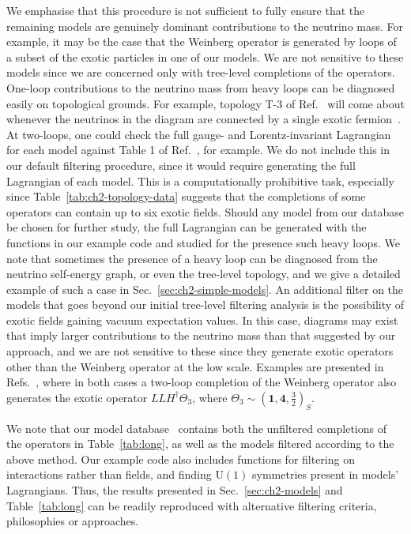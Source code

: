 We emphasise that this procedure is not sufficient to fully ensure that the
remaining models are genuinely dominant contributions to the neutrino mass. For
example, it may be the case that the Weinberg operator is generated by loops of
a subset of the exotic particles in one of our models. We are not sensitive to
these models since we are concerned only with tree-level completions of the
operators. One-loop contributions to the neutrino mass from heavy loops can be
diagnosed easily on topological grounds. For example, topology \textsf{T-3} of
Ref.~\cite{Bonnet:2009ej} will come about whenever the neutrinos in the diagram
are connected by a single exotic fermion~\cite{Angel:2012ug}. At two-loops, one
could check the full gauge- and Lorentz-invariant Lagrangian for each model
against Table 1 of Ref.~\cite{Sierra:2014rxa}, for example. We do not include
this in our default filtering procedure, since it would require generating the
full Lagrangian of each model. This is a computationally prohibitive task,
especially since Table~\ref{tab:ch2-topology-data} suggests that the completions of
some operators can contain up to six exotic fields. Should any model from our
database be chosen for further study, the full Lagrangian can be generated with
the functions in our example code and studied for the presence such heavy loops.
We note that sometimes the presence of a heavy loop can be diagnosed from the
neutrino self-energy graph, or even the tree-level topology, and we give a
detailed example of such a case in Sec.~\ref{sec:ch2-simple-models}. An additional
filter on the models that goes beyond our initial tree-level filtering analysis
is the possibility of exotic fields gaining vacuum expectation values. In this
case, diagrams may exist that imply larger contributions to the neutrino mass
than that suggested by our approach, and we are not sensitive to these since
they generate exotic operators other than the Weinberg operator at the low
scale. Examples are presented in Refs.~\cite{Popov:2019tyc, Babu:2020hun}, where
in both cases a two-loop completion of the Weinberg operator also generates the
exotic operator $LLH^{\dagger}\Theta_{3}$, where
$\Theta_{3} \sim (\mathbf{1}, \mathbf{4}, \tfrac{3}{2})_{S}$.

We note that our model database~\cite{gargalionis_john_2020_4054618} contains
both the unfiltered completions of the operators in Table~\ref{tab:long}, as
well as the models filtered according to the above method. Our example code also
includes functions for filtering on interactions rather than fields, and finding
$\mathrm{U}(1)$ symmetries present in models' Lagrangians. Thus, the results
presented in Sec.~\ref{sec:ch2-models} and Table~\ref{tab:long} can be readily
reproduced with alternative filtering criteria, philosophies or approaches.

